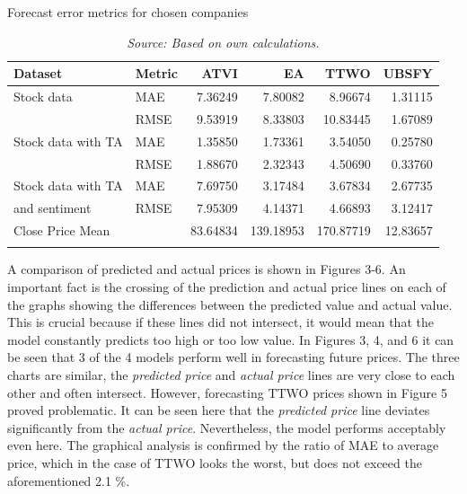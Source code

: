 \documentclass[11pt]{article} %
\begin{document}
\begin{table}[H]
\centering
\caption{Forecast error metrics for chosen companies}
\begin{tabular}{llrrrr}
\toprule
 Dataset & Metric &          ATVI &           EA &         TTWO &        UBSFY \\
\midrule
Stock data& MAE              &   7.36249 &    7.80082 &    8.96674 &  1.31115 \\
&RMSE             &   9.53919 &    8.33803 &    10.83445 &   1.67089 \\
Stock data with TA& MAE              &   1.35850 &    1.73361 &    3.54050 &   0.25780 \\
&RMSE             &   1.88670 &    2.32343 &    4.50690 &   0.33760 \\
Stock data with TA& MAE              &   7.69750 &    3.17484 &    3.67834 &   2.67735 \\
and sentiment& RMSE              &   7.95309 &    4.14371 &    4.66893 &   3.12417 \\
\midrule
Close Price Mean & &  83.64834 &  139.18953 &  170.87719 &  12.83657 \\


&               &    &     &    &    \\
\bottomrule
\end{tabular}
\caption*{\textit{Source: Based on own calculations.}}
\end{table}

A comparison of predicted and actual prices is shown in Figures 3-6. An important fact is the crossing of the prediction and actual price lines on each of the graphs showing the differences between the predicted value and actual value. This is crucial because if these lines did not intersect, it would mean that the model constantly predicts too high or too low value. In Figures 3, 4, and 6 it can be seen that 3 of the 4 models perform well in forecasting future prices. The three charts are similar, the \textit{predicted price} and \textit{actual price} lines are very close to each other and often intersect. However, forecasting TTWO prices shown in Figure 5 proved problematic. It can be seen here that the \textit{predicted price} line deviates significantly from the \textit{actual price}. Nevertheless, the model performs acceptably even here. The graphical analysis is confirmed by the ratio of MAE to average price, which in the case of TTWO looks the worst, but does not exceed the aforementioned 2.1 \%.
\\
\end{document}
